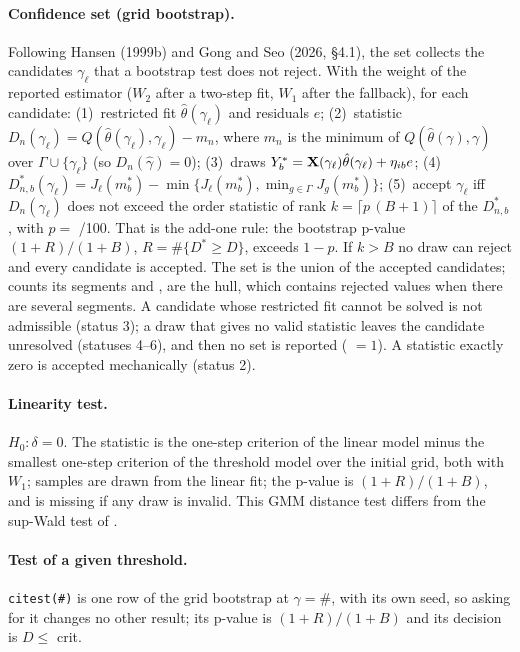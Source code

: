 \documentclass[
  10.5pt,
  a4paper,
]{article}
\begin{document}
\paragraph{Confidence set (grid bootstrap).} Following Hansen (1999b) and Gong and Seo (2026, \S4.1), the
set collects the candidates $\gamma_\ell$ that a bootstrap test does not reject. With the weight of
the reported estimator ($W_2$ after a two-step fit, $W_1$ after the fallback), for each candidate:
(1)~restricted fit $\hat\theta(\gamma_\ell)$ and residuals $e$; (2)~statistic
$D_n(\gamma_\ell)=Q(\hat\theta(\gamma_\ell),\gamma_\ell)-m_n$, where $m_n$ is the minimum of
$Q(\hat\theta(\gamma),\gamma)$ over $\Gamma\cup\{\gamma_\ell\}$ (so $D_n(\hat\gamma)=0$);
(3)~draws $Y^*_b=\mathbf{X}(\gamma_\ell)\hat\theta(\gamma_\ell)+\eta_{ib}e$; (4)~$D^*_{n,b}(\gamma_\ell)=J_\ell(m^*_b)-\min\{J_\ell(m^*_b),\min_{g\in\Gamma}J_g(m^*_b)\}$;
(5)~accept $\gamma_\ell$ iff $D_n(\gamma_\ell)$ does not exceed the order statistic of rank
$k=\lceil p\,(B+1)\rceil$ of the $D^*_{n,b}$, with $p=$ /100. That is the add-one rule:
the bootstrap p-value $(1+R)/(1+B)$, $R=\#\{D^*\ge D\}$, exceeds $1-p$. If $k>B$ no draw can reject and
every candidate is accepted. The set is the union of the accepted candidates; 
counts its segments and ,  are the hull, which contains rejected
values when there are several segments. A candidate whose restricted fit cannot be solved is not
admissible (status 3); a draw that gives no valid statistic leaves the candidate unresolved
(statuses 4--6), and then no set is reported ( $=1$). A statistic exactly zero
is accepted mechanically (status 2).

\paragraph{Linearity test.} $H_0:\delta=0$. The statistic is the one-step criterion of the linear model
minus the smallest one-step criterion of the threshold model over the initial grid, both with $W_1$;
samples are drawn from the linear fit; the p-value is $(1+R)/(1+B)$, and is missing if any draw is invalid.
This GMM distance test differs from the sup-Wald test of .

\paragraph{Test of a given threshold.} \texttt{citest(\#)} is one row of the grid bootstrap at $\gamma=\#$,
with its own seed, so asking for it changes no other result; its p-value is $(1+R)/(1+B)$ and its
decision is $D\le$ crit.
\end{document}
